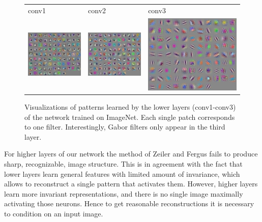 \documentclass{article} %
\begin{document}
\begin{figure}
\hspace*{-.0cm}
\begin{center}
\begin{tabular}{>{\centering\arraybackslash} m{3.3cm} >{\centering\arraybackslash} m{3.3cm} >{\centering\arraybackslash} m{4.3cm}}
  conv1 & conv2 & conv3 \\
  \includegraphics[width=.23\textwidth]{maxactiv_conv1_zeiler_stride.png} &
  \includegraphics[width=.23\textwidth]{maxactiv_cccp2_zeiler_stride.png} &
  \includegraphics[width=.3\textwidth]{maxactiv_pool0_zeiler_stride.png} \\
\end{tabular}
\end{center}
\vspace*{-0.2cm}
\caption{Visualizations of patterns learned by the lower layers (conv1-conv3) of the network trained on ImageNet. Each single patch corresponds to one filter. Interestingly, Gabor filters only appear in the third layer.}
\label{fig:lower_layer_reconstructions}
\vspace*{-0.2cm}
\end{figure}

For higher layers of our network the method of Zeiler and Fergus fails to produce sharp, recognizable, image structure. This is in agreement with the fact that lower layers learn general features with limited amount of invariance, which allows to reconstruct a single pattern that activates them. However, higher layers learn more invariant representations, and there is no single image maximally activating those neurons. Hence to get reasonable reconstructions it is necessary to condition on an input image.
\end{document}
